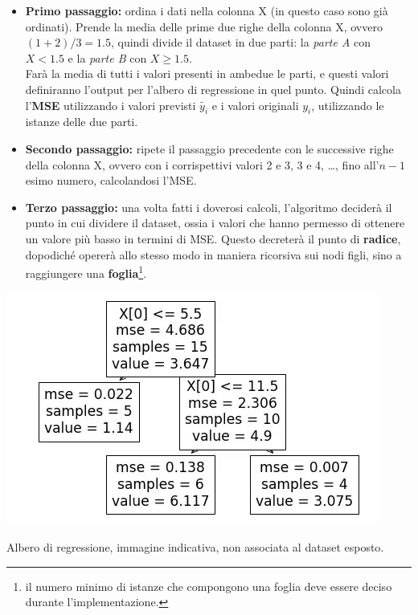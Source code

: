 \documentclass[a4paper, 11pt, oneside]{report}
\begin{document}
                \begin{itemize}
                    \item \textbf{Primo passaggio:} ordina i dati nella colonna X (in questo caso sono già ordinati).
                    Prende la media delle prime due righe della colonna X, ovvero $(1+2)/3 = 1.5$, quindi divide il dataset
                    in due parti: la \textit{parte A} con $X < 1.5$ e la \textit{parte B} con $X \geq 1.5$.
                    \\Farà la media di tutti i valori presenti in ambedue le parti, e questi valori
                    definiranno l'output per l'albero di regressione in quel punto. Quindi calcola l'\textbf{MSE}
                    utilizzando i valori previsti $\tilde{y_i}$ e i valori originali $y_i$, utilizzando le istanze
                    delle due parti.
                    \item \textbf{Secondo passaggio:} ripete il passaggio precedente con le successive righe della colonna
                    X, ovvero con i corrispettivi valori 2 e 3, 3 e 4, \ldots, fino all'$n-1$esimo numero, calcolandosi
                    l'MSE.
                    \item \textbf{Terzo passaggio:} una volta fatti i doverosi calcoli, l'algoritmo deciderà il punto in cui
                    dividere il dataset, ossia i valori che hanno permesso di ottenere un valore più basso in termini di MSE. Questo decreterà
                    il punto di \textbf{radice}, dopodiché opererà allo stesso modo in maniera ricorsiva sui nodi figli, sino a raggiungere
                    una \textbf{foglia}\footnote{il numero minimo di istanze che compongono una foglia deve essere deciso durante
                    l'implementazione.}.
                \end{itemize}
                \medskip
                \begin{center}
                    \hspace*{5em}\includegraphics[scale=0.7]{albero}
                    \par \noindet Albero di regressione, immagine indicativa, non associata al dataset esposto.
                \end{center}
\end{document}
